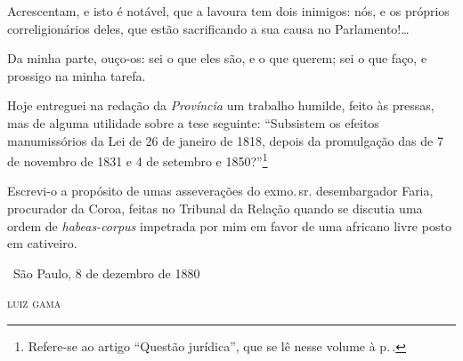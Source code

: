 {

Acrescentam, e isto é notável, que a lavoura tem dois inimigos: nós, e
os próprios correligionários deles, que estão sacrificando a sua causa
no Parlamento!\ldots{}

Da minha parte, ouço-os: sei o que eles são, e o que querem; sei o que
faço, e prossigo na minha tarefa.

Hoje entreguei na redação da \emph{Província} um trabalho humilde, feito
às pressas, mas de alguma utilidade sobre a tese seguinte: ``Subsistem os
efeitos manumissórios da Lei de 26 de janeiro de 1818, depois da
promulgação das de 7 de novembro de 1831 e 4 de setembro e
1850?''\footnote{Refere-se ao artigo ``Questão jurídica'', que se lê
  nesse volume à p.\,\pageref{questao}.}

Escrevi-o a propósito de
umas asseverações do exmo.\,sr. desembargador Faria, procurador da Coroa,
feitas no Tribunal da Relação quando se discutia uma ordem de
\emph{habeas-corpus} impetrada por mim em favor de uma africano livre
posto em cativeiro.

\medskip

\hfill\ São Paulo, 8 de dezembro de 1880

\hfill\textsc{luiz gama}


}
